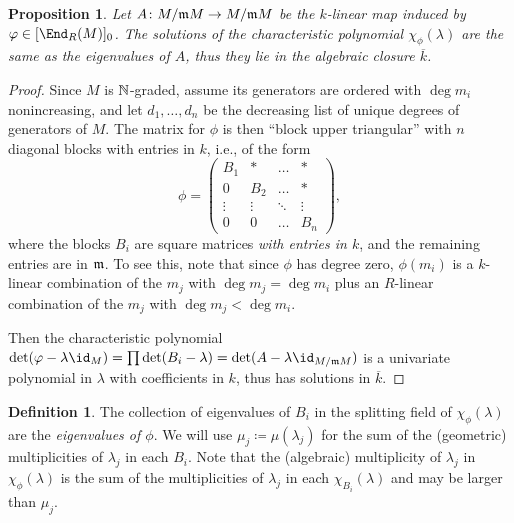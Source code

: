 \documentclass[12pt]{article}
\let\bar\overline
\theoremstyle{theorem}
\numberwithin{thm}{section}
\newtheorem{prop}[thm]{Proposition}
\theoremstyle{definition}
\newtheorem{dfn}[thm]{Definition}
\begin{document}
\begin{prop}\label{prop:eigenvalues}
  Let $A\colon M/\mathfrak m M\to M/\mathfrak m M$ be the $k$-linear map induced by $\phi\in[\End_R(M)]_0$. The solutions of the characteristic polynomial $\chi_\phi(\lambda)$ are the same as the eigenvalues of $A$, thus they lie in the algebraic closure $\bar k$.
\end{prop}
\begin{proof}
  Since $M$ is $\mathbb N$-graded, assume its generators are ordered with $\deg m_i$ nonincreasing, and let $d_1,\dots,d_n$ be the decreasing list of unique degrees of generators of $M$. The matrix for $\phi$ is then ``block upper triangular'' with $n$ diagonal blocks with entries in $k$, i.e., of the form
  \begin{equation}\label{eq:blocks}
    \phi = \begin{pmatrix}
    B_1    & *      & \dots  & *      \\
    0      & B_2    & \dots  & *      \\
    \vdots & \vdots & \ddots & \vdots \\
    0      & 0      & \dots  & B_n
    \end{pmatrix},
  \end{equation}
  where the blocks $B_i$ are square matrices \emph{with entries in $k$}, and the remaining entries are in $\mathfrak m$. To see this, note that since $\phi$ has degree zero, $\phi(m_i)$ is a $k$-linear combination of the $m_j$ with $\deg m_j = \deg m_i$ plus an $R$-linear combination of the $m_j$ with $\deg m_j < \deg m_i$. %

  Then the characteristic polynomial $\det(\phi - \lambda \id_M) = \prod \det(B_i - \lambda) = \det(A - \lambda \id_{M/\m M})$ is a univariate polynomial in $\lambda$ with coefficients in $k$, thus has solutions in $\bar k$.
\end{proof}

\begin{dfn}\label{def:eigenvalues}
  The collection of eigenvalues of $B_i$ in the splitting field of $\chi_\phi(\lambda)$ are the \emph{eigenvalues of $\phi$}. We will use $\mu_j \coloneqq \mu(\lambda_j)$ for the sum of the (geometric) multiplicities of $\lambda_j$ in each $B_i$. Note that the (algebraic) multiplicity of $\lambda_j$ in $\chi_\phi(\lambda)$ is the sum of the multiplicities of $\lambda_j$ in each $\chi_{B_i}(\lambda)$ and may be larger than $\mu_j$.
\end{dfn}
\end{document}
